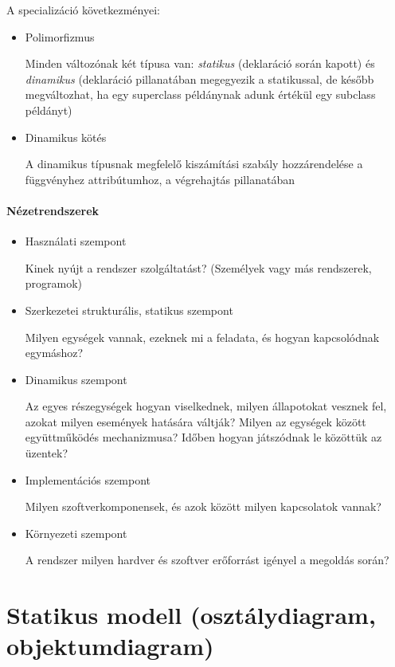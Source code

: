 \documentclass[12pt,margin=0px]{article}
\begin{document}
\begin{itemize}
	A specializáció következményei:
	\begin{itemize}
		\item Polimorfizmus
				 	
        Minden változónak két típusa van: \textit{statikus} (deklaráció során kapott) és \textit{dinamikus} (deklaráció pillanatában megegyezik a statikussal, de később megváltozhat, ha egy superclass példánynak adunk értékül egy subclass példányt)
		\item Dinamikus kötés
				 	
        A dinamikus típusnak megfelelő kiszámítási szabály hozzárendelése a függvényhez attribútumhoz, a végrehajtás pillanatában
	\end{itemize}

	\paragraph{Nézetrendszerek}

	\begin{itemize}
		\item Használati szempont
					
			Kinek nyújt a rendszer szolgáltatást? (Személyek vagy más rendszerek, programok)
						
		\item Szerkezetei strukturális, statikus szempont
					
			Milyen egységek vannak, ezeknek mi a feladata, és hogyan kapcsolódnak egymáshoz?
						
		\item Dinamikus szempont
					
        Az egyes részegységek hogyan viselkednek, milyen állapotokat vesznek fel, azokat milyen események hatására váltják? Milyen az egységek között együttműködés mechanizmusa? Időben hogyan játszódnak le közöttük az üzentek?
						
		\item Implementációs szempont
					
			Milyen szoftverkomponensek, és azok között milyen kapcsolatok vannak?
						
		\item Környezeti szempont
					
			A rendszer milyen hardver és szoftver erőforrást igényel a megoldás során?
		\end{itemize}
	\end{itemize}

	\section*{Statikus modell (osztálydiagram, objektumdiagram)}
\end{document}
